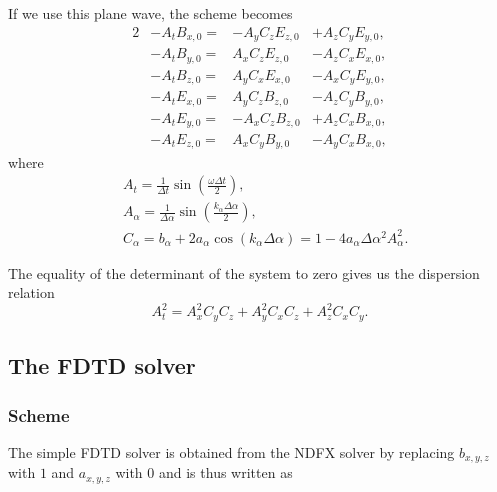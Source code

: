 \documentclass[12pt,a4paper,DIV=calc]{scrartcl}
\begin{document}
If we use this plane wave, the scheme becomes
\begin{alignat}{2}
    &-A_t B_{x,0} = &- A_y C_z E_{z,0} &+ A_z C_y E_{y,0},\\
    &-A_t B_{y,0} = & A_x C_z E_{z,0} &- A_z C_x E_{x,0},\\
    &-A_t B_{z,0} = & A_y C_x E_{x,0} &- A_x C_y E_{y,0},\\
    &-A_t E_{x,0} = & A_y C_z B_{z,0} &- A_z C_y B_{y,0},\\
    &-A_t E_{y,0} = & -A_x C_z B_{z,0} &+ A_z C_x B_{x,0},\\
    &-A_t E_{z,0} = & A_x C_y B_{y,0} &- A_y C_x B_{x,0},
\end{alignat}
where 
\begin{align}
    &A_t = \frac{1}{\Delta t} \sin(\frac{\omega \Delta t}{2}),\\
    &A_\alpha = \frac{1}{\Delta \alpha} \sin(\frac{k_\alpha \Delta \alpha}{2}),\\
    &C_\alpha = b_\alpha + 2 a_\alpha \cos(k_\alpha \Delta \alpha) = 1 - 4 a_\alpha \Delta \alpha^2 A_\alpha^2.
\end{align}

The equality of the determinant of the system to zero gives us the dispersion relation
\begin{equation}
    A_t^2 = A_x^2 C_y C_z + A_y^2 C_x C_z + A_z^2 C_x C_y.
\end{equation}

\subsection{The FDTD solver}

\subsubsection{Scheme}

The simple FDTD solver is obtained from the NDFX solver by replacing $b_{x,y,z}$ with $1$ and $a_{x,y,z}$ with $0$ and is thus written as
\end{document}
